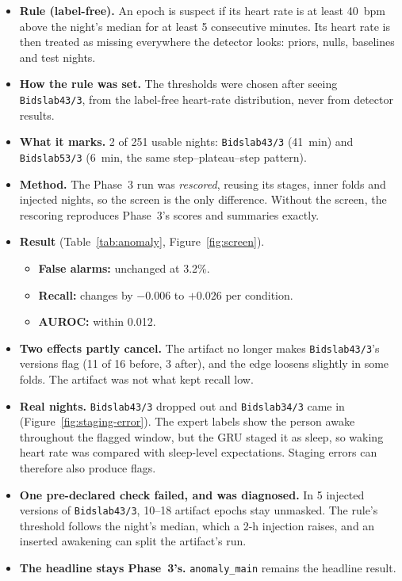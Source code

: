 \documentclass[11pt,a4paper]{article}
\newcommand{\night}[2]{\texttt{Bidslab#1/#2}}
\newcommand{\code}[1]{\texttt{#1}}
\begin{document}
\begin{itemize}
\item \textbf{Rule (label-free).} An epoch is suspect if its heart rate is at least 40~bpm above
the night's median for at least 5 consecutive minutes. Its heart rate is then treated as missing
everywhere the detector looks: priors, nulls, baselines and test nights.
\item \textbf{How the rule was set.} The thresholds were chosen after seeing \night{43}{3}, from
the label-free heart-rate distribution, never from detector results.
\item \textbf{What it marks.} 2 of 251 usable nights: \night{43}{3} (41~min) and \night{53}{3}
(6~min, the same step--plateau--step pattern).
\item \textbf{Method.} The Phase~3 run was \emph{rescored}, reusing its stages, inner folds and
injected nights, so the screen is the only difference. Without the screen, the rescoring
reproduces Phase~3's scores and summaries exactly.
\item \textbf{Result} (Table~\ref{tab:anomaly}, Figure~\ref{fig:screen}).
  \begin{itemize}
  \item \textbf{False alarms:} unchanged at 3.2\%.
  \item \textbf{Recall:} changes by $-0.006$ to $+0.026$ per condition.
  \item \textbf{AUROC:} within 0.012.
  \end{itemize}
\item \textbf{Two effects partly cancel.} The artifact no longer makes \night{43}{3}'s versions
flag (11 of 16 before, 3 after), and the edge loosens slightly in some folds. The artifact was
not what kept recall low.
\item \textbf{Real nights.} \night{43}{3} dropped out and \night{34}{3} came in
(Figure~\ref{fig:staging-error}). The expert labels show the person awake throughout the flagged
window, but the GRU staged it as sleep, so waking heart rate was compared with sleep-level
expectations. Staging errors can therefore also produce flags.
\item \textbf{One pre-declared check failed, and was diagnosed.} In 5 injected versions of
\night{43}{3}, 10--18 artifact epochs stay unmasked. The rule's threshold follows the night's
median, which a 2-h injection raises, and an inserted awakening can split the artifact's run.
\item \textbf{The headline stays Phase~3's.} \code{anomaly\_main} remains the headline result.
\end{itemize}
\end{document}
